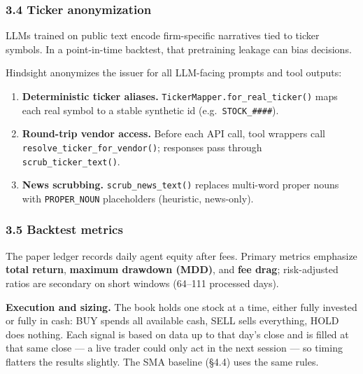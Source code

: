 \documentclass{article}
\begin{document}
\subsubsection{3.4 Ticker anonymization}\label{ticker-anonymization}

LLMs trained on public text encode firm-specific narratives tied to
ticker symbols. In a point-in-time backtest, that pretraining
leakage can bias decisions.

Hindsight anonymizes the issuer for all LLM-facing prompts and tool outputs:

\begin{enumerate}
\item \textbf{Deterministic ticker aliases.}
  \texttt{TickerMapper.for\_real\_ticker()} maps each real symbol to a
  stable synthetic id (e.g.\ \texttt{STOCK\_\#\#\#\#}).

\item \textbf{Round-trip vendor access.}
  Before each API call, tool wrappers call
  \texttt{resolve\_ticker\_for\_vendor()}; responses pass through
  \texttt{scrub\_ticker\_text()}.

\item \textbf{News scrubbing.}
  \texttt{scrub\_news\_text()} replaces multi-word proper nouns with
  \texttt{PROPER\_NOUN} placeholders (heuristic, news-only).
\end{enumerate}

\subsubsection{3.5 Backtest metrics}\label{backtest-metrics}

The paper ledger records daily agent equity after fees. Primary metrics emphasize \textbf{total
return}, \textbf{maximum drawdown (MDD)}, and \textbf{fee drag};
risk-adjusted ratios are secondary on short windows (64--111 processed
days).

\textbf{Execution and sizing.} The book holds one stock at a time,
either fully invested or fully in cash: BUY spends all available cash,
SELL sells everything, HOLD does nothing. Each signal is based on data
up to that day's close and is filled at that same close --- a live
trader could only act in the next session --- so timing flatters the
results slightly. The SMA baseline (\S 4.4) uses the same rules.
\end{document}
